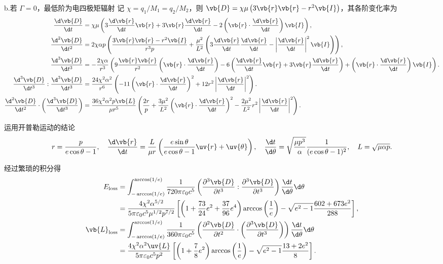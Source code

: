 \begin{example}
	b.若 \(\Gamma = 0\)，最低阶为电四极矩辐射
	记 \(\chi = q_1/M_1=q_2/M_2\)，则 \(\vb{D} = \chi \mu \left( 3\vb{r}\vb{r} - r^2 \vb{I} \right)\)，其各阶变化率为
	\begin{align*}
		\frac{\d \vb{D}}{\d t} &= \chi \mu \left( 3\frac{\d \vb{r}}{\d t}\vb{r} + 3\vb{r}\frac{\d \vb{r}}{\d t} - 2\left( \vb{r} \cdot \frac{\d \vb{r}}{\d t} \right)\vb{I} \right), \\
		\frac{\d^2\vb{D}}{\d t^2} &= 2\chi \alpha p \left( \frac{3\vb{r}\vb{r} - r^2 \vb{I}}{r^3 p} + \frac{\mu^2}{L^2} \left( 3\frac{\d \vb{r}}{\d t}\frac{\d \vb{r}}{\d t} - \left| \frac{\d \vb{r}}{\d t} \right|^2 \vb{I} \right) \right), \\
		\frac{\d^3\vb{D}}{\d t^3} &= -\frac{2\chi \alpha}{r^3} \left( 9\frac{\vb{r}\vb{r}}{r^2} \left( \vb{r} \cdot \frac{\d \vb{r}}{\d t} \right) - 6\left( \frac{\d \vb{r}}{\d t}\vb{r} + 3\vb{r}\frac{\d \vb{r}}{\d t} \right) + \left( \vb{r} \cdot \frac{\d \vb{r}}{\d t} \right)\vb{I} \right).\\
		\frac{\d^3\vb{D}}{\d t^3} : \frac{\d^3\vb{D}}{\d t^3} &= \frac{24\chi^2 \alpha^2}{r^6} \left( -11\left( \vb{r} \cdot \frac{\d \vb{r}}{\d t} \right)^2 + 12 r^2 \left| \frac{\d \vb{r}}{\d t} \right|^2 \right).\\
		\frac{\d^2\vb{D}}{\d t^2} \cdot \left( \frac{\d^3\vb{D}}{\d t^3} \right) &= \frac{36\chi^2 \alpha^2 p \vb{L}}{\mu r^5} \left( \frac{2r}{p} + \frac{3\mu^2}{L^2} \left( \vb{r} \cdot \frac{\d \vb{r}}{\d t} \right)^2 - \frac{2\mu^2}{L^2} r^2 \left| \frac{\d \vb{r}}{\d t} \right|^2 \right).
	\end{align*}

	运用开普勒运动的结论
	\begin{equation*}
		r = \frac{p}{e\cos\theta - 1}, \quad \frac{\d \vb{r}}{\d t} = \frac{L}{\mu r} \left( \frac{e\sin\theta}{e\cos\theta - 1}\uv{r} + \uv{\theta} \right), \quad \frac{\d t}{\d \theta} = \sqrt{\frac{\mu p^3}{\alpha}} \frac{1}{(e\cos\theta - 1)^2}, \quad L = \sqrt{\mu\alpha p}.
	\end{equation*}

	经过繁琐的积分得
	\begin{align*}
		E_{\text{loss}} &= \int_{-\arccos(1/e)}^{\arccos(1/e)} \frac{1}{720\pi\varepsilon_0 c^5} \left( \frac{\partial^3\vb{D}}{\partial t^3} : \frac{\partial^3\vb{D}}{\partial t^3} \right) \frac{\d t}{\d \theta} \d \theta \\
		&= \frac{4\chi^2 \alpha^{5/2}}{5\pi\varepsilon_0 c^5 \mu^{1/2} p^{7/2}} \left[ \left( 1 + \frac{73}{24}e^2 + \frac{37}{96}e^4 \right)\arccos\left(\frac{1}{e}\right) - \sqrt{e^2 - 1} \frac{602 + 673e^2}{288} \right], \\
		\vb{L}_{\text{loss}} &= \int_{-\arccos(1/e)}^{\arccos(1/e)} \frac{1}{360\pi\varepsilon_0 c^5} \left( \frac{\partial^2\vb{D}}{\partial t^2} \cdot \left( \frac{\partial^3\vb{D}}{\partial t^3} \right) \right) \frac{\d t}{\d \theta} \d \theta \\
		&= \frac{4\chi^2 \alpha^2 \uv{L}}{5\pi\varepsilon_0 c^5 p^2} \left[ \left( 1 + \frac{7}{8}e^2 \right)\arccos\left(\frac{1}{e}\right) - \sqrt{e^2 - 1} \frac{13 + 2e^2}{8} \right].
	\end{align*}
\end{example}
